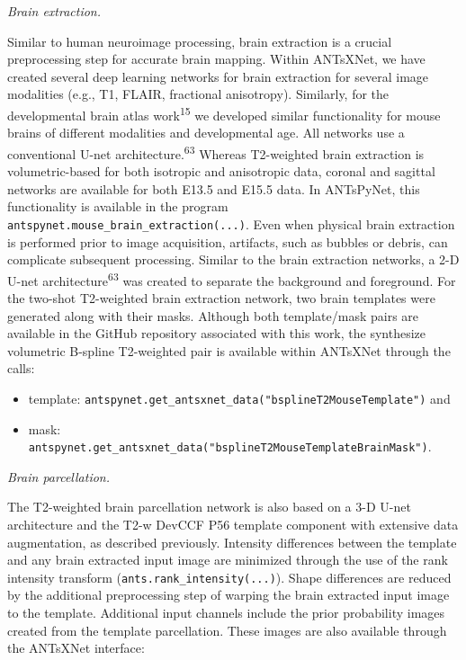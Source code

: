 \documentclass[
  12pt,
]{article}
\begin{document}
\emph{Brain extraction.}

Similar to human neuroimage processing, brain extraction is a crucial
preprocessing step for accurate brain mapping. Within ANTsXNet, we have
created several deep learning networks for brain extraction for several
image modalities (e.g., T1, FLAIR, fractional anisotropy). Similarly,
for the developmental brain atlas work\textsuperscript{15} we developed
similar functionality for mouse brains of different modalities and
developmental age. All networks use a conventional U-net
architecture.\textsuperscript{63} Whereas T2-weighted brain extraction
is volumetric-based for both isotropic and anisotropic data, coronal and
sagittal networks are available for both E13.5 and E15.5 data. In
ANTsPyNet, this functionality is available in the program
\texttt{antspynet.mouse\_brain\_extraction(...)}. Even when physical
brain extraction is performed prior to image acquisition, artifacts,
such as bubbles or debris, can complicate subsequent processing. Similar
to the brain extraction networks, a 2-D U-net
architecture\textsuperscript{63} was created to separate the background
and foreground. For the two-shot T2-weighted brain extraction network,
two brain templates were generated along with their masks. Although both
template/mask pairs are available in the GitHub repository associated
with this work, the synthesize volumetric B-spline T2-weighted pair is
available within ANTsXNet through the calls:

\begin{itemize}
\item
  template:
  \texttt{antspynet.get\_antsxnet\_data("bsplineT2MouseTemplate")} and
\item
  mask:
  \texttt{antspynet.get\_antsxnet\_data("bsplineT2MouseTemplateBrainMask")}.
\end{itemize}

\emph{Brain parcellation.}

The T2-weighted brain parcellation network is also based on a 3-D U-net
architecture and the T2-w DevCCF P56 template component with extensive
data augmentation, as described previously. Intensity differences
between the template and any brain extracted input image are minimized
through the use of the rank intensity transform
(\texttt{ants.rank\_intensity(...)}). Shape differences are reduced by
the additional preprocessing step of warping the brain extracted input
image to the template. Additional input channels include the prior
probability images created from the template parcellation. These images
are also available through the ANTsXNet interface:
\end{document}
